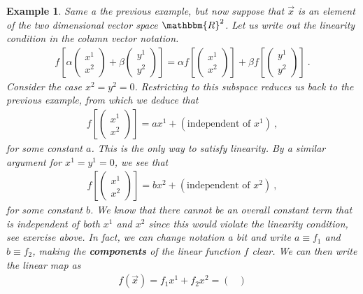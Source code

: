 \documentclass[
  11pt,
	colorful,
	raggedright,
]{tufte-style-thesis-flip}
\newtheorem{example}{Example}[section]
\begin{document}
\begin{example}
Same a the previous example, but now suppose that $\vec{x}$ is an element of the two dimensional vector space $\mathbbm{R}^2$. Let us write out the linearity condition in the column vector notation. 
\begin{align}
  f\left[
  \alpha 
  \begin{pmatrix}
    x^1 \\ x^2
  \end{pmatrix}
  + 
  \beta
  \begin{pmatrix}
    y^1 \\ y^2
  \end{pmatrix}
  \right]
  =
  \alpha f\left[
  \begin{pmatrix}
    x^1 \\ x^2
  \end{pmatrix}
  \right]
  + 
  \beta f\left[
  \begin{pmatrix}
    y^1 \\ y^2
  \end{pmatrix}
  \right] \ .
\end{align}
Consider the case $x^2 = y^2=0$. Restricting to this subspace reduces us back to the previous example, from which we deduce that
\begin{align}
  f\left[
  \begin{pmatrix}
    x^1 \\ x^2
  \end{pmatrix}
  \right]
  = a x^1 + \left(\text{independent of }x^1\right) \ ,
\end{align}
for some constant $a$.
This is the only way to satisfy linearity. By a similar argument for $x^1 = y^1 = 0$, we see that 
\begin{align}
  f\left[
  \begin{pmatrix}
    x^1 \\ x^2
  \end{pmatrix}
  \right]
  = b x^2 + \left(\text{independent of }x^2\right) \ ,
\end{align}
for some constant $b$. We know that there cannot be an overall constant term that is independent of both $x^1$ and $x^2$ since this would violate the linearity condition, see exercise above. In fact, we can change notation a bit and write $a\equiv f_1$ and $b\equiv f_2$, making the \textbf{components} of the linear function $f$ clear. We can then write the linear map as
\begin{align}
  f(\vec{x}) = f_1 x^1 + f_2 x^2 = 
  \begin{pmatrix}

\end{pmatrix}
\end{align}
\end{example}
\end{document}
